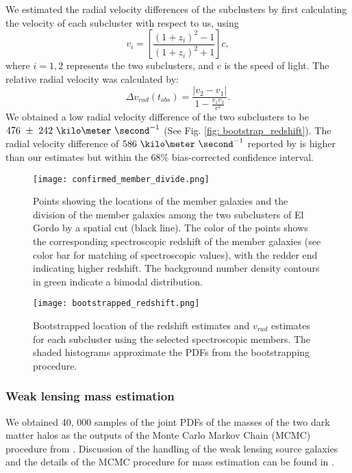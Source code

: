 We estimated the radial velocity differences of the
subclusters by first calculating the velocity of each subcluster with
respect to us, using  
\begin{equation}
	v_i = \left[ \frac{(1+z_i)^2 - 1 }{(1+z_i)^2 + 1 }\right]c,
\end{equation}
where $i=1, 2$ represents the two subclusters, and $c$ is the speed of
light. The relative radial velocity was calculated by: 
\begin{equation}
	\Delta v_{rad}(t_{obs}) = \frac{|v_2 - v_1|}{1-\frac{v_1 v_2}{c^2}}.
\end{equation}
We obtained a low radial velocity difference of the two subclusters to be
$476~\pm~242~\kilo\meter~\second^{-1}$ (See Fig. \ref{fig:
bootstrap_redshift}). 
The radial velocity difference of $586~\kilo \meter~\second^{-1}$ reported by  
is higher than our estimates but within the 68\% bias-corrected
confidence interval. 
\begin{figure}
	\texttt{[image: confirmed\_member\_divide.png]}
	\caption{\label{fig:membership} Points showing the locations of the
	member galaxies and the division of the member galaxies among the two subclusters of El Gordo by a spatial cut
(black line). The color of the points shows the corresponding spectroscopic
redshift of the member galaxies (see color bar for matching of
spectroscopic values), with the redder end indicating higher
redshift. The background number density contours in green indicate a bimodal
distribution.} 
\end{figure}
\begin{figure}
	\texttt{[image: bootstrapped\_redshift.png]}
	\caption{\label{fig: bootstrap_redshift} Bootstrapped location of the
	redshift estimates and $v_{rad}$ estimates for each subcluster using the
	selected spectroscopic members. The shaded histograms approximate the
	PDFs from the bootstrapping procedure.
} 
\end{figure}
\subsubsection{Weak lensing mass estimation} 
We obtained 40, 000 samples of the joint PDFs of the masses of the two dark
matter halos as the outputs of the Monte Carlo Markov Chain (MCMC)
procedure from \citealt{Jee13}. Discussion of the handling of the weak
lensing source galaxies and the details of the MCMC procedure for mass
estimation can be found in \citealt{Jee13}. 
